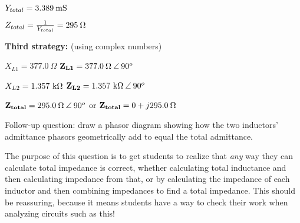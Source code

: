 $Y_{total} = 3.389 \> \hbox{mS}$

\vskip 5pt

$Z_{total} = {1 \over Y_{total}} = 295 \> \Omega$

\vskip 10pt

\goodbreak

\noindent
{\bf Third strategy:} (using complex numbers)

$X_{L1} = 377.0 \> \Omega$ \hskip 10pt ${\bf Z_{L1}} = 377.0 \> \Omega \> \angle \> 90^o$

$X_{L2} = 1.357 \hbox{ k}\Omega$ \hskip 10pt ${\bf Z_{L2}} = 1.357 \hbox{ k}\Omega \> \angle \> 90^o$

${\bf Z_{total}} = 295.0 \> \Omega \> \angle \> 90^o$ or ${\bf Z_{total}} = 0 + j295.0 \> \Omega$

\vskip 10pt

Follow-up question: draw a phasor diagram showing how the two inductors' admittance phasors geometrically add to equal the total admittance.







The purpose of this question is to get students to realize that {\it any} way they can calculate total impedance is correct, whether calculating total inductance and then calculating impedance from that, or by calculating the impedance of each inductor and then combining impedances to find a total impedance.  This should be reassuring, because it means students have a way to check their work when analyzing circuits such as this!




